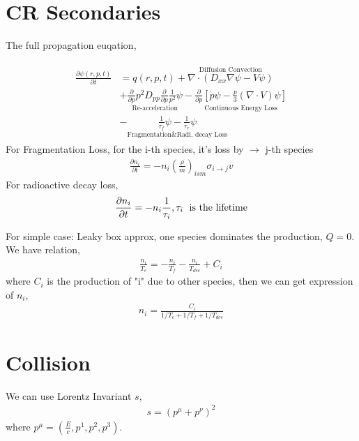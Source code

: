 \documentclass{sciposter}
\begin{document}
\begin{multicols}{3}
\section{CR Secondaries}
The full propagation euqation,

\begin{align}
    \begin{aligned}
      \frac{\partial \psi(r,p,t)}{\partial t}&=q(r,p,t)+\overset{\text{Diffusion Convection}}{\nabla\cdot (D_{xx}\nabla \psi-V\psi )}\\
      &+\underset{\text{Re-acceleration}}{\frac{\partial  }{\partial p}p^{2}D_{pp}\frac{\partial }{\partial p}\frac{1}{p^{2} }\psi  }-\underset{\text{Continuous Energy Loss}}{\frac{\partial }{\partial p}\left[\dot{p}\psi-\frac{p}{3}(\nabla\cdot V)\psi\right]}\\
      &-\underset{\text{Fragmentation\& Radi. decay Loss}}{\frac{1}{\tau_{f} }\psi-\frac{1}{\tau_{r} }\psi}
    \end{aligned}
\end{align}
For Fragmentation Loss, for the i-th species, it's loss by $\rightarrow$ j-th species 
\begin{align}
    \frac{\partial n_{i} }{\partial t}=-n_{i}(\frac{\rho}{m})_{ism}\sigma_{i\rightarrow j}v   
\end{align}
 For radioactive decay loss,
 \begin{align}
     \frac{\partial n_{i} }{\partial t}=-n_{i}\frac{1}{\tau_{i} }, \tau_{i} \text{\; is the lifetime}  
 \end{align}

For simple case: Leaky box approx, one species dominates the production, $Q=0$. We have relation,
\begin{align}
    \frac{n_{i} }{T_{e} }=-\frac{n_{i} }{T_{f} }-\frac{n_{i} }{T_{dec} }+C_{i} 
\end{align}
where $C_{i} $ is the production of "i" due to other species, then we can get expression of $n_{i} $,
\begin{align}
    n_{i}=\frac{C_{i} }{1/T_{e}+1/T_{f}+1/T_{dec}   } 
\end{align}

\section{Collision}

We can use Lorentz Invariant $s$,
\begin{align}
    s=(p^{\mu}+p^{\nu}  )^{2} 
\end{align}
where $p^{\mu}=(\frac{E}{c},p^{1},p^{2},p^{3}   ) $.


\end{multicols}
\end{document}
